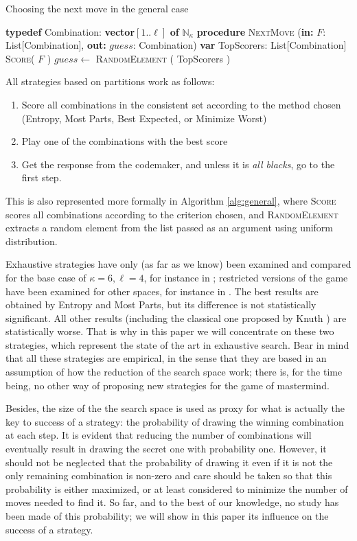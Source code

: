 \documentclass[preprint,12pt]{elsarticle}
\begin{document}
\begin{algorithm*}[htb!]
\caption{Choosing the next move in the general case}\label{alg:general}
\smallskip 

\textbf{typedef} Combination: \textbf{vector}$[1..\ell]$ \textbf{of} $\mathbb{N}_\kappa$\;
\BlankLine
\textbf{procedure} \textsc{NextMove} (\textbf{in:} $F$: List[Combination], \textbf{out:} $guess$: Combination)\;
\textbf{var} TopScorers: List[Combination]\; 
\textsc{Score}( $F$ )\;
$guess\leftarrow$ \textsc{RandomElement} ( TopScorers )\;
\end{algorithm*}
%
All strategies based on partitions work as follows:\begin{enumerate}
\item Score all combinations in the consistent set according to the
  method chosen (Entropy, Most Parts, Best Expected, or Minimize Worst)
\item Play one of the combinations with the best score
\item Get the response from the codemaker, and unless it is {\em all
    blacks}, go to the first step.
\end{enumerate}
This is also represented more formally in Algorithm \ref{alg:general},
where \textsc{Score} scores all combinations according to the
criterion chosen, and \textsc{RandomElement} extracts a random element
from the list passed as an argument using uniform distribution. 

Exhaustive strategies have only (as far as we know) been examined and compared for the
base case of $\kappa=6, \ell=4$, for instance in \cite{nicso};
restricted versions of the game have been examined for other spaces,
for instance in  \cite{o1991mastermind}. The best
results are obtained by Entropy and Most Parts, but its difference is
not statistically significant. All other results (including the
classical one proposed by Knuth \cite{Knuth}) are statistically
worse. That is why in this paper we will concentrate on these two
strategies, which represent the state of the art in exhaustive
search. Bear in mind that all these strategies are empirical, in the
sense that they are based in an assumption of how the reduction of the
search space work; there is, for the time being, no other way of
proposing new strategies for the game of mastermind. 

Besides, the size of the the search space is used as proxy for what is
actually the key to success of a strategy: the probability of drawing
the winning combination at each step. It is evident that reducing the
number of combinations will eventually result in drawing the secret
one with probability one. However, it should not be neglected that the
probability of drawing it even if it is not the only remaining
combination is non-zero and care should be taken so that this
probability is either maximized, or at least considered to minimize
the number of moves needed to find it. So far, and to the best of our
knowledge, no study has been made of this probability; we will show in
this paper its influence on the success of a strategy. 
\end{document}

